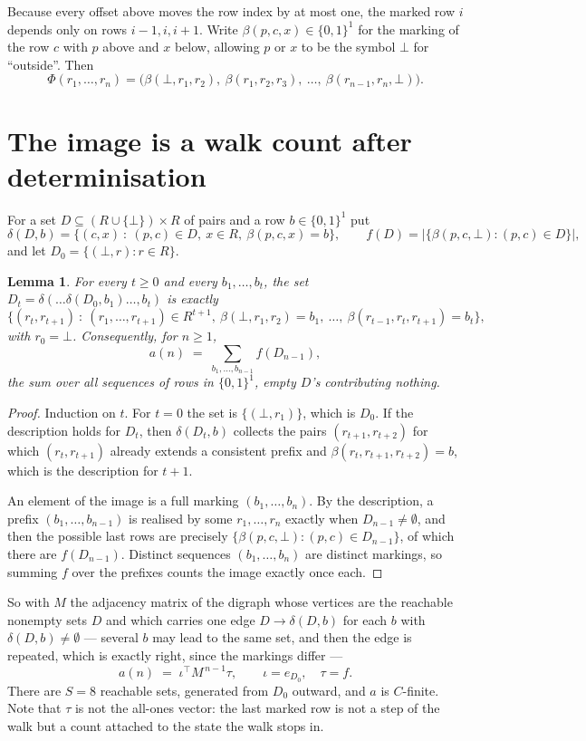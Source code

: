 \documentclass[11pt,a4paper]{article}
\theoremstyle{plain}
\newtheorem{lemma}[theorem]{Lemma}
\theoremstyle{definition}
\begin{document}
Because every offset above moves the row index by at most one, the marked row $i$ depends only
on rows $i-1,i,i+1$. Write $\beta(p,c,x)\in\{0,1\}^{1}$ for the marking of the row $c$
with $p$ above and $x$ below, allowing $p$ or $x$ to be the symbol $\bot$ for ``outside''.
Then
\[
\Phi(r_1,\dots,r_n)=\bigl(\beta(\bot,r_1,r_2),\ \beta(r_1,r_2,r_3),\ \dots,\
\beta(r_{n-1},r_n,\bot)\bigr).
\]

\section{The image is a walk count after determinisation}

For a set $D\subseteq(R\cup\{\bot\})\times R$ of pairs and a row $b\in\{0,1\}^{1}$ put
\[
\delta(D,b)=\{(c,x)\ :\ (p,c)\in D,\ x\in R,\ \beta(p,c,x)=b\},\qquad
f(D)=\bigl|\{\beta(p,c,\bot):(p,c)\in D\}\bigr| ,
\]
and let $D_0=\{(\bot,r):r\in R\}$.

\begin{lemma}\label{lem:det}
For every $t\ge0$ and every $b_1,\dots,b_t$, the set
$D_t=\delta(\dots\delta(D_0,b_1)\dots,b_t)$ is exactly
\[
\{(r_t,r_{t+1})\ :\ (r_1,\dots,r_{t+1})\in R^{t+1},\ \beta(\bot,r_1,r_2)=b_1,\ \dots,\
\beta(r_{t-1},r_t,r_{t+1})=b_t\} ,
\]
with $r_0=\bot$. Consequently, for $n\ge1$,
\[
a(n)\;=\;\sum_{b_1,\dots,b_{n-1}}f(D_{n-1}),
\]
the sum over all sequences of rows in $\{0,1\}^{1}$, empty $D$'s contributing nothing.
\end{lemma}

\begin{proof}
Induction on $t$. For $t=0$ the set is $\{(\bot,r_1)\}$, which is $D_0$. If the description
holds for $D_t$, then $\delta(D_t,b)$ collects the pairs $(r_{t+1},r_{t+2})$ for which
$(r_t,r_{t+1})$ already extends a consistent prefix and
$\beta(r_t,r_{t+1},r_{t+2})=b$, which is the description for $t+1$.

An element of the image is a full marking $(b_1,\dots,b_n)$. By the description, a prefix
$(b_1,\dots,b_{n-1})$ is realised by some $r_1,\dots,r_n$ exactly when $D_{n-1}\neq
\emptyset$, and then the possible last rows are precisely
$\{\beta(p,c,\bot):(p,c)\in D_{n-1}\}$, of which there are $f(D_{n-1})$. Distinct
sequences $(b_1,\dots,b_n)$ are distinct markings, so summing $f$ over the prefixes counts the
image exactly once each.
\end{proof}

So with $M$ the adjacency matrix of the digraph whose vertices are the reachable nonempty sets
$D$ and which carries one edge $D\to\delta(D,b)$ for each $b$ with $\delta(D,b)\neq\emptyset$
--- several $b$ may lead to the same set, and then the edge is repeated, which is exactly
right, since the markings differ ---
\[
a(n)\;=\;\iota^{\!\top}M^{\,n-1}\tau,\qquad \iota=e_{D_0},\quad \tau=f .
\]
There are $S=8$ reachable sets, generated from $D_0$ outward, and $a$ is $C$-finite. Note
that $\tau$ is not the all-ones vector: the last marked row is not a step of the walk but a
count attached to the state the walk stops in.
\end{document}
